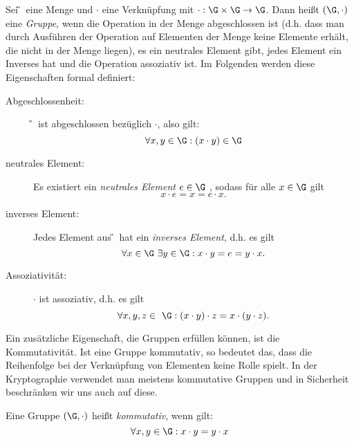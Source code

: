\begin{definition}[Gruppe]
Sei \G~eine Menge und $\cdot$ eine Verknüpfung mit $\cdot: \G\times \G \to
\G$. Dann heißt $(\G, \cdot)$ eine \textit{Gruppe}, wenn die Operation
in der Menge abgeschlossen ist (d.h. dass man durch Ausführen der
Operation auf Elementen der Menge keine Elemente erhält, die nicht in der
Menge liegen), es ein neutrales Element gibt, jedes 
Element ein Inverses hat und die Operation assoziativ ist. Im Folgenden
werden diese Eigenschaften formal definiert: 
\begin{description}
\item[Abgeschlossenheit:] \G~ist abgeschlossen bezüglich $\cdot$, also gilt:
  \[\forall x, y \in \G: (x\cdot y)\in \G\]
\item[neutrales Element:] Es existiert ein \textit{neutrales Element}  $e \in \G$ , sodass für
  alle $x \in \G$ gilt \[x\cdot e=x=e\cdot x.\]
\item[inverses Element:] Jedes Element aus \G~hat ein \textit{inverses Element}, d.h. es gilt \[\forall x \in
  \G~ \exists y \in \G: x\cdot y=e=y\cdot x.\]

\item[Assoziativität:] $\cdot$ ist assoziativ, d.h. es gilt \[\forall x, y, z  \in ~\G:
  (x\cdot y)\cdot z = x\cdot(y \cdot z).\]
\end{description}
\end{definition}

Ein zusätzliche Eigenschaft, die Gruppen erfüllen können, ist die
Kommutativität. Ist eine Gruppe kommutativ, so bedeutet das, dass die
Reihenfolge bei der Verknüpfung von Elementen keine Rolle spielt. In der
Kryptographie verwendet man meistens kommutative Gruppen und in
\glqq Sicherheit\grqq{} beschränken wir uns auch auf diese. 
\begin{definition}
  Eine Gruppe $(\G, \cdot)$ heißt \textit{kommutativ}, wenn gilt:
\[
  \forall x, y \in \G: x \cdot y = y \cdot x
\]
\end{definition}

